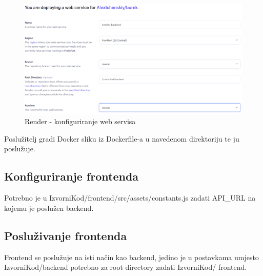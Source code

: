 \begin{figure}[H]
	\includegraphics[scale=0.4]{slike/render_backend1.png}
	\centering
	\caption{Render - konfiguriranje web servisa}
	\label{fig:render_backend2}
\end{figure}

Poslužitelj gradi Docker sliku iz Dockerfile-a u navedenom direktoriju te ju 
poslužuje.

\subsection{Konfiguriranje frontenda}

Potrebno je u IzvorniKod/frontend/src/assets/constants.js zadati API_URL na 
kojemu je poslužen backend.

\subsection{Posluživanje frontenda}

Frontend se poslužuje na isti način kao backend, jedino je u postavkama 
umjesto IzvorniKod/backend potrebno za root directory zadati IzvorniKod/
frontend.

\eject 